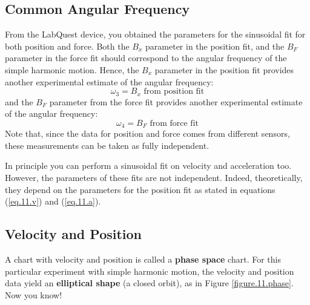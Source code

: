 \subsection{Common Angular Frequency}
From the LabQuest device, you obtained the parameters for the sinusoidal fit for both position and force. Both the $B_{x}$ parameter in the position fit, and the $B_{F}$ parameter in the force fit should correspond to the angular frequency of the simple harmonic motion. Hence, the $B_{x}$ parameter in the position fit provides another experimental estimate of the angular frequency:
\begin{equation}
    \omega_{3} = B_{x} \text{ from position fit}
\end{equation}
and the $B_{F}$ parameter from the force fit provides another experimental estimate of the angular frequency:
\begin{equation}
    \omega_{4} = B_{F} \text{ from force fit}
\end{equation}
Note that, since the data for position and force comes from different sensors, these measurements can be taken as fully independent.

In principle you can perform a sinusoidal fit on velocity and acceleration too. However, the parameters of these fits are not independent. Indeed, theoretically, they depend on the parameters for the position fit as stated in equations (\ref{eq.11.v}) and (\ref{eq.11.a}).
\subsection{Velocity and Position}
A chart with velocity and position is called a \textbf{phase space} chart. For this particular experiment with simple harmonic motion, the velocity and position data yield an \textbf{elliptical shape} (a closed orbit), as in Figure \ref{figure.11.phase}. Now you know!
